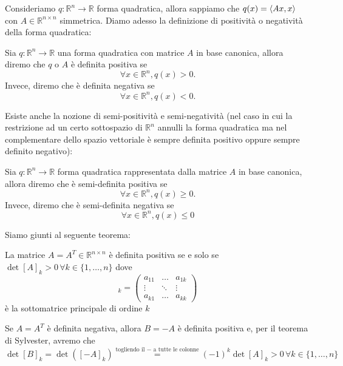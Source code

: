 \documentclass[openany, italian]{book}
\begin{document}
Consideriamo $q: \mathbb{R}^n \to \mathbb{R}$ forma quadratica, allora sappiamo che $q(x) = \langle Ax, x \rangle$ con $A \in \mathbb{R}^{n \times n}$ simmetrica. Diamo adesso la definizione di positività o negatività della forma quadratica:
\begin{definition}
Sia $q:\mathbb{R}^n \to \mathbb{R}$ una forma quadratica con matrice $A$ in base canonica, allora diremo che $q$ o $A$ è definita positiva se
$$
\forall x \in \mathbb{R}^n, q(x) > 0.
$$
Invece, diremo che è definita negativa se
$$
\forall x \in \mathbb{R}^n, q(x) < 0.
$$
\end{definition}
Esiste anche la nozione di semi-positività e semi-negatività (nel caso in cui la restrizione ad un certo sottospazio di $\mathbb{R}^n$ annulli la forma quadratica ma nel complementare dello spazio vettoriale è sempre definita positivo oppure sempre definito negativo):
\begin{definition}
Sia $q: \mathbb{R}^n \to \mathbb{R}$ forma quadratica rappresentata dalla matrice $A$ in base canonica, allora diremo che è semi-definita positiva se
$$
\forall x \in \mathbb{R}^n, q(x) \geq 0.
$$
Invece, diremo che è semi-definita negativa se
$$
\forall x \in \mathbb{R}^n, q(x) \leq 0
$$
\end{definition}
Siamo giunti al seguente teorema:
\begin{theorem}
La matrice $A=A^{T} \in \mathbb{R}^{n \times n}$ è definita positiva se e solo se $\det{[A]}_k > 0 \, \forall k \in \{1, \ldots, n\}$ dove
\begin{equation*}
[A]_k = \begin{pmatrix}
a_{11} & \ldots & a_{1k} \\
\vdots & \ddots & \vdots \\
a_{k1} & \ldots & a_{kk}
\end{pmatrix}
\end{equation*}
è la sottomatrice principale di ordine $k$
\end{theorem}
\begin{remark}
Se $A=A^{T}$ è definita negativa, allora $B=-A$ è definita positiva e, per il teorema di Sylvester, avremo che
$$
\det{[B]_k} = \det{([-A]_k)} \stackrel{\text{togliendo il } - \text{ a tutte le colonne}}{=} (-1)^k \det{[A]_k} > 0 \, \forall k \in \{1, \ldots, n \}
$$
\end{remark}
\end{document}
